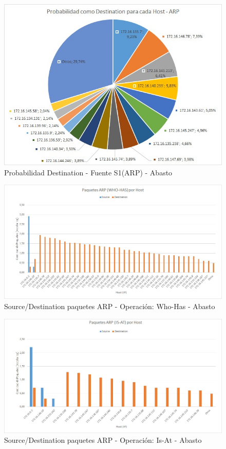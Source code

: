 \begin{figure}[h!]
\centering
\includegraphics[width=\textwidth]{./img/proba_dst_abasto.jpg}
\caption{Probabilidad Destination - Fuente S1(ARP) - Abasto}
\end{figure}
\newpage

\begin{figure}[h!]
\centering
\includegraphics[width=\textwidth]{./img/arp_whoHas_abasto.jpg}
\caption{Source/Destination paquetes ARP - Operación: Who-Has - Abasto}
\end{figure}

\begin{figure}[h!]
\centering
\includegraphics[width=\textwidth]{./img/arp_isAt_abasto.jpg}
\caption{Source/Destination paquetes ARP - Operación: Is-At - Abasto}
\end{figure}
